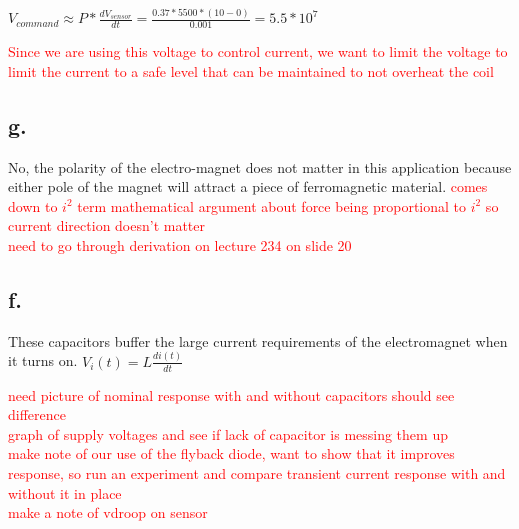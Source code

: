 \documentclass{article}
\newcommand{\xxx}[1]{\textcolor{red}{#1}}
\theoremstyle{plain}
\theoremstyle{definition}
\theoremstyle{remark}
\begin{document}
\begin{center}
$V_{command} \approx P * \frac{dV_{sensor}}{dt}  = \frac{0.37 * 5500 * (10 - 0)}{0.001} = 5.5*10^7$
\end{center}

\xxx{Since we are using this voltage to control current, we want to limit the voltage to limit the current to a safe level that can be maintained to not overheat the coil}

\subsection*{g.}
No, the polarity of the electro-magnet does not matter in this application because either pole of the magnet will attract a piece of ferromagnetic material. \xxx{comes down to $i^2$ term}
\xxx{mathematical argument about force being proportional to $i^2$ so current direction doesn't matter} \\
\xxx{need to go through derivation on lecture 234 on slide 20}

\subsection*{f.}
These capacitors buffer the large current requirements of the electromagnet when it turns on. 
$V_i(t) = L\frac{di(t)}{dt}$

\xxx{need picture of nominal response with and without capacitors should see difference}\\
\xxx{graph of supply voltages and see if lack of capacitor is messing them up}\\

\xxx{make note of our use of the flyback diode, want to show that it improves response, so run an experiment and compare transient current response with and without it in place} \\

\xxx{make a note of vdroop on sensor} \\
\end{document}
